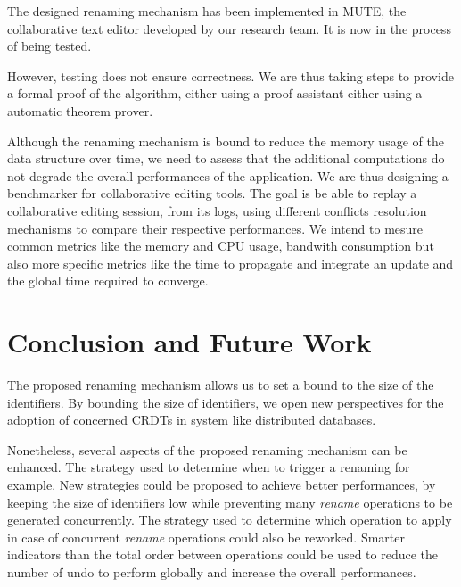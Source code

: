 \documentclass[sigplan]{acmart}
\begin{document}
The designed renaming mechanism has been implemented in MUTE, the collaborative text editor developed by our research team.
It is now in the process of being tested.

However, testing does not ensure correctness.
We are thus taking steps to provide a formal proof of the algorithm, either using a proof assistant either using a automatic theorem prover.

Although the renaming mechanism is bound to reduce the memory usage of the data structure over time, we need to assess that the additional computations do not degrade the overall performances of the application.
We are thus designing a benchmarker for collaborative editing tools.
The goal is be able to replay a collaborative editing session, from its logs, using different conflicts resolution mechanisms to compare their respective performances.
We intend to mesure common metrics like the memory and CPU usage, bandwith consumption but also more specific metrics like the time to propagate and integrate an update and the global time required to converge.

\section{Conclusion and Future Work}


The proposed renaming mechanism allows us to set a bound to the size of the identifiers.
By bounding the size of identifiers, we open new perspectives for the adoption of concerned \acp{CRDT} in system like distributed databases.

Nonetheless, several aspects of the proposed renaming mechanism can be enhanced.
The strategy used to determine when to trigger a renaming for example.
New strategies could be proposed to achieve better performances, by keeping the size of identifiers low while preventing many \emph{rename} operations to be generated concurrently.
The strategy used to determine which operation to apply in case of concurrent \emph{rename} operations could also be reworked. Smarter indicators than the total order between operations could be used to reduce the number of undo to perform globally and increase the overall performances.
\end{document}
